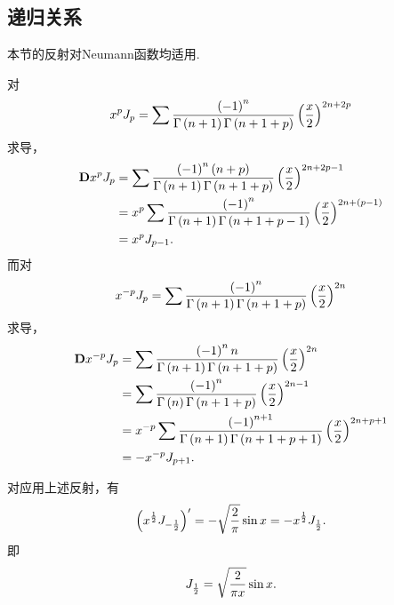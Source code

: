 \documentclass[UTF-8]{ctexart}
\begin{document}
  \subsection{递归关系}
  本节的反射对Neumann函数均适用.
  \par 
  对
  \[ x^pJ_p = \sum \frac{\left(-1\right)^n}{\Gamma\left(n+1\right)\Gamma\left(n+1+p\right)}\left(\frac{x}{2}\right)^{2n+2p} \]
  求导，
  \begin{align*}
    \mathbf{D} x^p J_p &= \sum \frac{\left(-1\right)^n \left(n+p\right)}{\Gamma\left(n+1\right)\Gamma\left(n+1+p\right)}\left(\frac{x}{2}\right)^{2n+2p-1} \\
    &= x^p \sum \frac{\left(-1\right)^n}{\Gamma\left(n+1\right)\Gamma\left(n+1+p-1\right)}\left(\frac{x}{2}\right)^{2n+\left(p-1\right)} \\
    &= x^p J_{p-1}.
  \end{align*}
  而对
  \[ x^{-p}J_p = \sum \frac{\left(-1\right)^n}{\Gamma\left(n+1\right)\Gamma\left(n+1+p\right)}\left(\frac{x}{2}\right)^{2n} \]
  求导，
  \begin{align*}
    \mathbf{D} x^{-p} J_p &= \sum \frac{\left(-1\right)^n n}{\Gamma\left(n+1\right)\Gamma\left(n+1+p\right)}\left(\frac{x}{2}\right)^{2n} \\
    &= \sum \frac{\left(-1\right)^n}{\Gamma\left(n\right)\Gamma\left(n+1+p\right)}\left(\frac{x}{2}\right)^{2n-1} \\
    &= x^{-p} \sum \frac{\left(-1\right)^{n+1}}{\Gamma\left(n+1\right)\Gamma\left(n+1+p+1\right)}\left(\frac{x}{2}\right)^{2n+p+1} \\
    &= -x^{-p}J_{p+1}.
  \end{align*}
  \begin{ex}
    \label{ex:phalf}
    对应用上述反射，有
    \[ \left(x^{\frac{1}{2}}J_{-\frac{1}{2}}\right)' = -\sqrt{\frac{2}{\pi}}\sin x = -x^{\frac{1}{2}}J_{\frac{1}{2}}. \]
    即
    \[ J_{\frac{1}{2}} = \sqrt{\frac{2}{\pi x}}\sin x. \]
  \end{ex}
\end{document}
